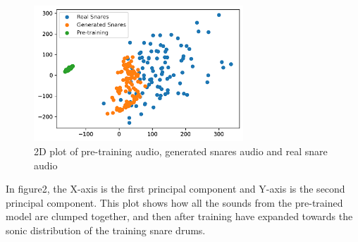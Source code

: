 \documentclass{article} %
\begin{document}
\begin{figure}[H] 
\centering 
\includegraphics[width=0.7\textwidth]{unnamed} 
\caption{2D plot of pre-training audio, generated snares audio and  real snare audio}
\label{Fig.main2}
\end{figure}
In figure2, the X-axis is the first principal component and Y-axis is the second principal component. This plot shows how all the sounds from the pre-trained model are clumped together, and then after training have expanded towards the sonic distribution of the training snare drums. 


\newpage


\end{document}
